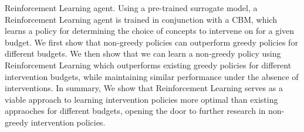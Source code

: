 \documentclass[../main.tex]{subfiles}
\begin{document}
Reinforcement Learning agent.
Using a pre-trained surrogate model, a Reinforcement Learning agent 
is trained in conjunction with a CBM, 
which learns a policy for determining the choice of concepts
to intervene on for a given budget.
We first show that non-greedy policies can outperform 
greedy policies for different budgets.
We then show that we can learn a non-greedy policy using Reinforcement Learning which outperforms
existing greedy policies for different intervention budgets, 
while maintaining similar 
performance under the absence of interventions.
In summary, We show that Reinforcement Learning serves as a viable approach to 
learning intervention policies more optimal than
existing appraoches for different budgets, 
opening the door to further research in non-greedy intervention policies.


\end{document}
